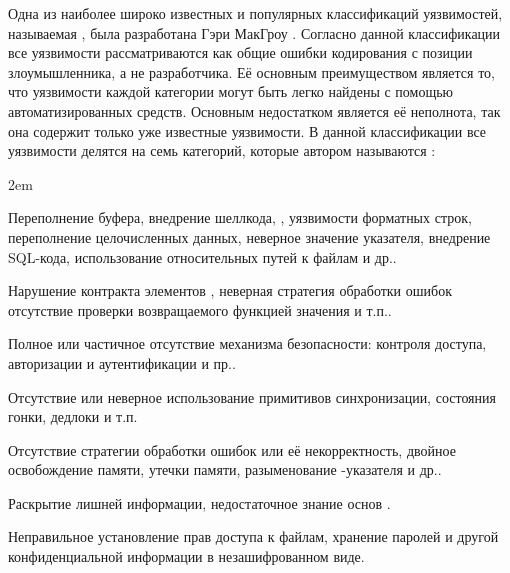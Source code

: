 \Sentence
Одна из наиболее широко известных и популярных классификаций уязвимостей, называемая 
, была разработана Гэри МакГроу 
  . 
\Sentence
Согласно данной классификации все уязвимости рассматриваются как общие ошибки кодирования 
с позиции злоумышленника, а не разработчика. 
\Sentence
Её основным преимуществом является то, что уязвимости каждой категории могут быть легко найдены с 
помощью автоматизированных средств. 
\Sentence
Основным недостатком является её неполнота, так она содержит только уже известные уязвимости. 
\Sentence
В данной классификации все уязвимости делятся на семь категорий, которые автором называются 
:  
\begin{description}
	\leftskip2em%
	\setlength{\itemsep}{0pt}%
	\setlength{\parsep}{0pt}%

	\item[Проверка входных данных и их представление.] Переполнение буфера, внедрение шеллкода, 
		, уязвимости форматных строк, переполнение целочисленных данных, 
		неверное значение указателя, внедрение SQL-кода, использование относительных путей к файлам 
		и др..
	\item[Неправильное использование API.] Нарушение контракта элементов 
		, неверная стратегия обработки ошибок отсутствие проверки 
		возвращаемого функцией значения и т.п..
	\item[Средства безопасности.] Полное или частичное отсутствие механизма безопасности: контроля 
		доступа, авторизации и аутентификации и пр..
	\item[Время и состояние.] Отсутствие или неверное использование примитивов синхронизации, 
		состояния гонки, дедлоки и т.п.
	\item[Ошибки.] Отсутствие стратегии обработки ошибок или её некорректность, двойное освобождение 
		памяти, утечки памяти, разыменование -указателя и др..
	\item[Инкапсуляция.] Раскрытие лишней информации, недостаточное знание основ 
		.
	\item[Программное окружение.] Неправильное установление прав доступа к файлам, хранение паролей 
		и другой конфиденциальной информации в незашифрованном виде.
\end{description}


